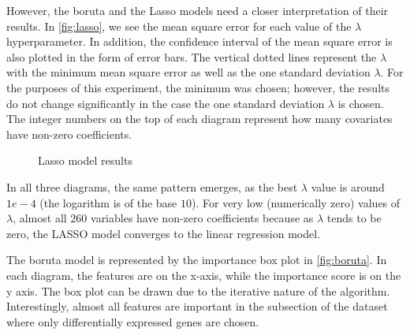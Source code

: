 \documentclass[11pt,twoside]{article}
\numberwithin{Theorem}{section}
\numberwithin{Definition}{section}
\numberwithin{Lemma}{section}
\numberwithin{Algorithm}{section}
\numberwithin{equation}{section}
\begin{document}
However, the boruta and the Lasso models need a closer interpretation of their results. In \autoref{fig:lasso}, we see the mean square error for each value of the $\lambda$ hyperparameter. In addition, the confidence interval of the mean square error is also plotted in the form of error bars. The vertical dotted lines represent the $\lambda$ with the minimum mean square error as well as the one standard deviation $\lambda$. For the purposes of this experiment, the minimum was chosen; however, the results do not change significantly in the case the one standard deviation $\lambda$ is chosen. The integer numbers on the top of each diagram represent how many covariates have non-zero coefficients.

\begin{figure}[h]
    \centering
    \caption{Lasso model results}
    \label{fig:lasso}
\end{figure}

In all three diagrams, the same pattern emerges, as the best $\lambda$ value is around $1e-4$ (the logarithm is of the base $10$). For very low (numerically zero) values of $\lambda$, almost all $260$ variables have non-zero coefficients because as $\lambda$ tends to be zero, the LASSO model converges to the linear regression model. 

The boruta model is represented by the importance box plot in \autoref{fig:boruta}. In each diagram, the features are on the x-axis, while the importance score is on the y axis. The box plot can be drawn due to the iterative nature of the algorithm. Interestingly, almost all features are important in the subsection of the dataset where only differentially expressed genes are chosen.
\end{document}
